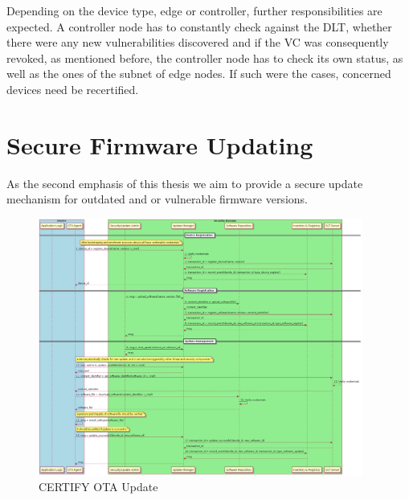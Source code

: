 Depending on the device type, edge or controller, further responsibilities are expected. A controller node has to
constantly check against the DLT, whether there were any new vulnerabilities discovered and if the VC was consequently
revoked, as mentioned before, the controller node has to check its own status, as well as the ones of the subnet of
edge nodes. If such were the cases, concerned devices need be recertified.




\section{Secure Firmware Updating} %
\label{sec:Secure Firmware Updating}

As the second emphasis of this thesis we aim to provide a secure update mechanism for outdated and or vulnerable
firmware versions.

\begin{figure}
	\begin{center}
		\includegraphics[width=0.95\textwidth]{figures/ota-update-certify-V1.2.png}
	\end{center}
	\caption{CERTIFY OTA Update \cite{certifyproject2023}}
	\label{fig:ota-update-certify}
\end{figure}


